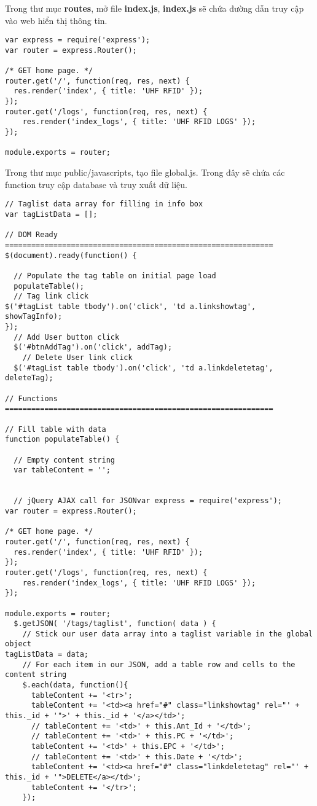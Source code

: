 Trong thư mục \textbf{routes}, mở file \textbf{index.js}, \textbf{index.js} sẽ chứa đường dẫn truy cập vào web hiển thị thông tin.
\begin{lstlisting}
var express = require('express');
var router = express.Router();

/* GET home page. */
router.get('/', function(req, res, next) {
  res.render('index', { title: 'UHF RFID' });
});
router.get('/logs', function(req, res, next) {
	res.render('index_logs', { title: 'UHF RFID LOGS' });
});

module.exports = router;

\end{lstlisting}

Trong thư mục public/javascripts, tạo file global.js. Trong đây sẽ chứa các function truy cập database và truy xuất dữ liệu.
\begin{lstlisting}
// Taglist data array for filling in info box
var tagListData = [];

// DOM Ready =============================================================
$(document).ready(function() {

  // Populate the tag table on initial page load
  populateTable();
  // Tag link click
$('#tagList table tbody').on('click', 'td a.linkshowtag', showTagInfo);
});
  // Add User button click
  $('#btnAddTag').on('click', addTag);
    // Delete User link click
  $('#tagList table tbody').on('click', 'td a.linkdeletetag', deleteTag);

// Functions =============================================================

// Fill table with data
function populateTable() {

  // Empty content string
  var tableContent = '';


  // jQuery AJAX call for JSONvar express = require('express');
var router = express.Router();

/* GET home page. */
router.get('/', function(req, res, next) {
  res.render('index', { title: 'UHF RFID' });
});
router.get('/logs', function(req, res, next) {
	res.render('index_logs', { title: 'UHF RFID LOGS' });
});

module.exports = router;
  $.getJSON( '/tags/taglist', function( data ) {
    // Stick our user data array into a taglist variable in the global object
tagListData = data;
    // For each item in our JSON, add a table row and cells to the content string
    $.each(data, function(){
      tableContent += '<tr>';
      tableContent += '<td><a href="#" class="linkshowtag" rel="' + this._id + '">' + this._id + '</a></td>';
      // tableContent += '<td>' + this.Ant_Id + '</td>';
      // tableContent += '<td>' + this.PC + '</td>';
      tableContent += '<td>' + this.EPC + '</td>';
      // tableContent += '<td>' + this.Date + '</td>';
      tableContent += '<td><a href="#" class="linkdeletetag" rel="' + this._id + '">DELETE</a></td>';
      tableContent += '</tr>';
    });


\end{lstlisting}
